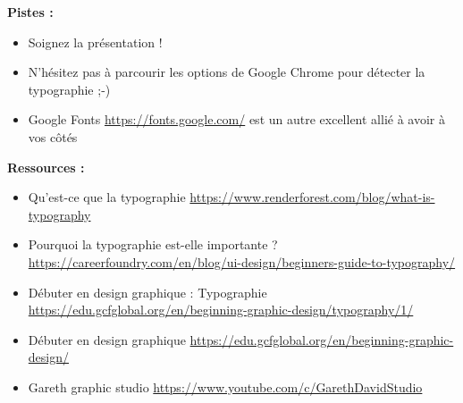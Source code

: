 \textbf{Pistes :}

\begin{itemize}
\item Soignez la présentation !
\item N'hésitez pas à parcourir les options de Google Chrome pour détecter la typographie ;-)
\item Google Fonts \url{https://fonts.google.com/} est un autre excellent allié à avoir à vos côtés
\end{itemize}

\textbf{Ressources :}

\begin{itemize}
\item Qu'est-ce que la typographie \url{https://www.renderforest.com/blog/what-is-typography}
\item Pourquoi la typographie est-elle importante ? \url{https://careerfoundry.com/en/blog/ui-design/beginners-guide-to-typography/}
\item Débuter en design graphique : Typographie \url{https://edu.gcfglobal.org/en/beginning-graphic-design/typography/1/}
\item Débuter en design graphique \url{https://edu.gcfglobal.org/en/beginning-graphic-design/}
\item Gareth graphic studio \url{https://www.youtube.com/c/GarethDavidStudio}
\end{itemize}

